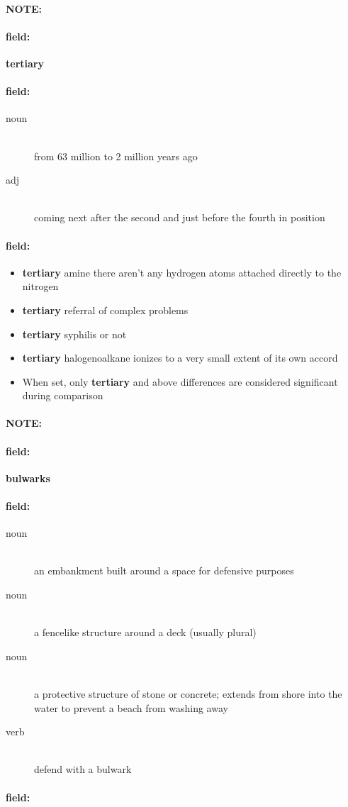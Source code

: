 \documentclass[12pt]{article}
\newenvironment{note}{\paragraph{NOTE:}}{}
\newenvironment{field}{\paragraph{field:}}{}
\begin{document}
\begin{note}
\begin{field}
\textbf{\large tertiary}
\end{field}


\begin{field}
\begin{description}
\item[noun] \hfill \\ 
from 63 million to 2 million years ago

\item[adj] \hfill \\ 
coming next after the second and just before the fourth in position

\end{description}
\end{field}

\begin{field}
\begin{itemize}
\item \textbf{tertiary} amine there aren't any hydrogen atoms attached directly to the nitrogen
\item \textbf{tertiary} referral of complex problems
\item \textbf{tertiary} syphilis or not
\item \textbf{tertiary} halogenoalkane ionizes to a very small extent of its own accord
\item When set, only \textbf{tertiary} and above differences are considered significant during comparison
\end{itemize}
\end{field}
\end{note}
\begin{note}
\begin{field}
\textbf{\large bulwarks}
\end{field}


\begin{field}
\begin{description}
\item[noun] \hfill \\ 
an embankment built around a space for defensive purposes

\item[noun] \hfill \\ 
a fencelike structure around a deck (usually plural)

\item[noun] \hfill \\ 
a protective structure of stone or concrete; extends from shore into the water to prevent a beach from washing away

\item[verb] \hfill \\ 
defend with a bulwark

\end{description}
\end{field}

\begin{field}
\end{field}
\end{note}
\end{document}
